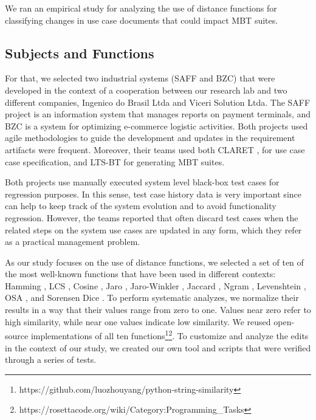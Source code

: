 We ran an empirical study for analyzing the use of distance functions for classifying changes in use case documents that could impact MBT suites. 

\subsection{Subjects and Functions}
For that, we selected two industrial systems (SAFF and BZC) that were developed in the context of a cooperation between
our research lab and two different companies, Ingenico do Brasil Ltda and Viceri Solution Ltda. The SAFF project is an information
system that manages reports on payment terminals,
and BZC is a system for optimizing e-commerce logistic activities. Both projects used agile methodologies to guide the development and updates in the requirement artifacts were frequent. Moreover, their teams used both CLARET \cite{dalton2017claret}, for use case case specification, and LTS-BT \cite{cartaxo2008lts} for generating MBT suites. 

Both projects use manually executed system level black-box test cases for regression purposes. In this sense, test case history data is very important since can help to keep track of the system evolution and to avoid functionality regression. However, the teams reported that often discard test cases when the related steps on the system use cases are updated in any form, which they refer as a practical management problem.

As our study focuses on the use of distance functions, we selected a set of ten of the most well-known functions that have been used in different contexts: Hamming \cite{hamming1950error}, LCS \cite{han2007efficient:LCS}, Cosine \cite{huang2008similaritycosine}, Jaro \cite{de1mahalanobis:jaro}, Jaro-Winkler \cite{de1mahalanobis:jaro}, Jaccard \cite{Lu2013SimilaridadeJaccard}, Ngram \cite{Kondrak2005ngram}, Levenshtein \cite{Levenshtein_SPD66}, OSA \cite{Damerau:1964}, and Sorensen Dice \cite{sorensen1948method}. To perform systematic analyzes, we normalize their results in a way that their values range from zero to one. Values near zero refer to high similarity, while near one values indicate low similarity. We reused open-source implementations of all ten functions\footnote{https://github.com/luozhouyang/python-string-similarity}\footnote{https://rosettacode.org/wiki/Category:Programming\_Tasks}. To customize and analyze the edits in the context of our study, we created our own tool and scripts that were verified through a series of tests.

